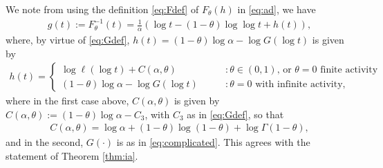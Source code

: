 \documentclass[a4,12pt]{amsart}
\numberwithin{equation}{section}
\newtheorem{lemma}[thm]{Lemma}
\begin{document}
We note from using the definition \eqref{eq:Fdef} of $F_\theta(h)$ in \eqref{eq:ad}, we have
\begin{align} \label{eq:gnew}
g(t) := F_\theta^{-1}(t) = \frac{1}{\alpha}( \log t - (1-\theta) \log \log t + h(t)),
\end{align}
where, by virtue of \eqref{eq:Gdef}, $h(t) = (1-\theta)\log \alpha - \log G ( \log t)$ is given by 
\begin{align*}
h(t) = 
\begin{cases}
\log \ell (\log t ) + C(\alpha,\theta) \qquad &:\text{$\theta \in (0,1)$, or $\theta = 0$ finite activity}\\
(1-\theta) \log \alpha - \log G( \log t) \qquad &:\text{$\theta = 0$ with infinite activity},
\end{cases}
\end{align*}
where in the first case above, $C(\alpha,\theta)$ is given by $C(\alpha,\theta) := (1-\theta)\log \alpha - C_3$, with $C_3$ as in \eqref{eq:Gdef}, so that 
\begin{align*}
C(\alpha,\theta) = \log \alpha + (1-\theta)\log(1-\theta) + \log \Gamma(1-\theta),
    \end{align*}
 and in the second, $G(\cdot)$ is as in \eqref{eq:complicated}. This agrees with the statement of Theorem \ref{thm:ia}.


\end{document}
